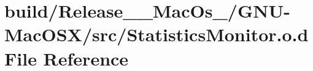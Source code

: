 \hypertarget{_release_____mac_os___2_g_n_u-_mac_o_s_x_2src_2_statistics_monitor_8o_8d}{}\section{build/\+Release\+\_\+\+\_\+\+Mac\+Os\+\_\+/\+G\+N\+U-\/\+Mac\+O\+S\+X/src/\+Statistics\+Monitor.o.\+d File Reference}
\label{_release_____mac_os___2_g_n_u-_mac_o_s_x_2src_2_statistics_monitor_8o_8d}
